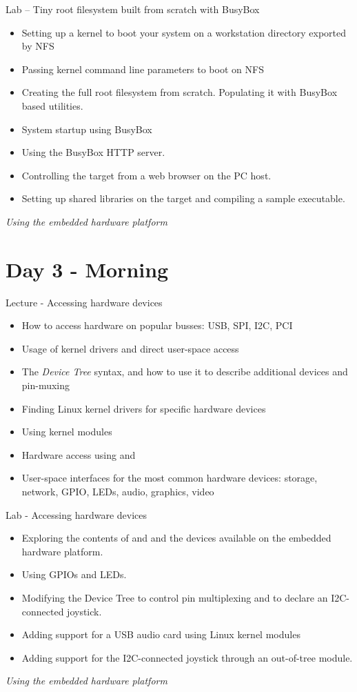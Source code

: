 \documentclass[a4paper,12pt,obeyspaces,spaces,hyphens]{article}
\begin{document}
\feagendaonecolumn
{Lab – Tiny root filesystem built from scratch with BusyBox}
{
  \begin{itemize}
  \item Setting up a kernel to boot your system on a workstation
    directory exported by NFS
  \item Passing kernel command line parameters to boot on NFS
  \item Creating the full root filesystem from scratch.
    Populating it with BusyBox based utilities.
  \item System startup using BusyBox 
  \item Using the BusyBox HTTP server.
  \item Controlling the target from a web browser on the PC host.
  \item Setting up shared libraries on the target and compiling
    a sample executable.
  \end{itemize}

  \vspace{0.5cm}
  {\em Using the embedded hardware platform}
}

\section{Day 3 - Morning}

\feagendatwocolumn
{Lecture - Accessing hardware devices}
{
  \begin{itemize}
  \item How to access hardware on popular busses: USB, SPI, I2C, PCI
  \item Usage of kernel drivers and direct user-space access
  \item The {\em Device Tree} syntax, and how to use it to describe
    additional devices and pin-muxing
  \item Finding Linux kernel drivers for specific hardware devices
  \item Using kernel modules
  \item Hardware access using  and 
  \item User-space interfaces for the most common hardware devices:
    storage, network, GPIO, LEDs, audio, graphics, video
  \end{itemize}
}
{Lab - Accessing hardware devices}
{
  \begin{itemize}
  \item Exploring the contents of  and  and the
    devices available on the embedded hardware platform.
  \item Using GPIOs and LEDs.
  \item Modifying the Device Tree to control pin multiplexing and
        to declare an I2C-connected joystick.
  \item Adding support for a USB audio card using Linux kernel modules
  \item Adding support for the I2C-connected joystick through
        an out-of-tree module.
  \end{itemize}

  \vspace{0.5cm}
  {\em Using the embedded hardware platform}
}
\end{document}
